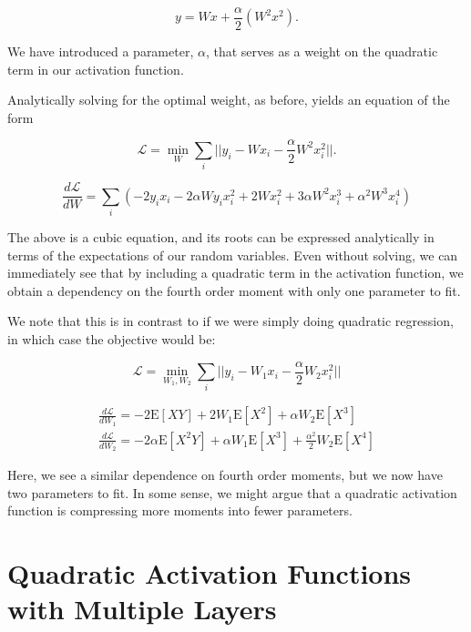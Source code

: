 \documentclass{article}
\begin{document}
\begin{equation}
y = Wx + \frac{\alpha}{2} (W^2 x^2).
\end{equation}

We have introduced a parameter, $\alpha$, that serves as a weight on the quadratic term in our activation function. 

Analytically solving for the optimal weight, as before, yields an equation of the form

\begin{equation}
\mathcal{L} = \min_{W} \sum_{i} || y_i - Wx_i - \frac{\alpha}{2} W^{2} x_{i}^{2} ||.
\end{equation}

\begin{equation}
\frac{d\mathcal{L}}{dW} = \sum_{i} (- 2 y_{i} x_{i} - 2 \alpha W y_{i} x_{i}^2 + 2 W x_{i}^{2} +3 \alpha W^{2} x_{i}^{3} + \alpha^{2} W^{3} x_{i}^{4})
\end{equation}

The above is a cubic equation, and its roots can be expressed analytically in terms of the expectations of our random variables. Even without solving, we can immediately see that by including a quadratic term in the activation function, we obtain a dependency on the fourth order moment with only one parameter to fit. 


We note that this is in contrast to if we were simply doing quadratic regression, in which case the objective would be:

\begin{equation}
\mathcal{L} = \min_{W_{1}, W_{2}} \sum_{i} || y_{i} - W_{1} x_{i} - \frac{\alpha}{2} W_{2}  x_{i}^{2} ||
\end{equation}

\begin{align}
\frac{d\mathcal{L}}{dW_{1}} =  -2 \mathrm{E}[XY] + 2W_{1} \mathrm{E}[X^{2}] + \alpha W_{2} \mathrm{E}[X^3]\\
\frac{d\mathcal{L}}{dW_{2}} =  -2\alpha \mathrm{E}[X^{2}Y] + \alpha W_{1} \mathrm{E}[X^{3}] + \frac{\alpha^{2}}{2} W_{2} \mathrm{E}[X^4]
\end{align}


Here, we see a similar dependence on fourth order moments, but we now have two parameters to fit. In some sense, we might argue that a quadratic activation function is compressing more moments into fewer parameters. 

\section{Quadratic Activation Functions with Multiple Layers}
\end{document}
